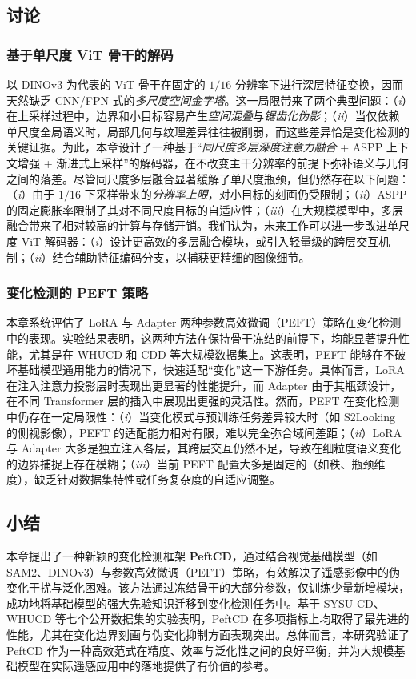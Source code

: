 \subsection{讨论}
\subsubsection{基于单尺度 ViT 骨干的解码}
以 DINOv3 为代表的 ViT 骨干在固定的 $1/16$ 分辨率下进行深层特征变换，因而天然缺乏 CNN/FPN 式的\emph{多尺度空间金字塔}。这一局限带来了两个典型问题：（\emph{i}）在上采样过程中，边界和小目标容易产生\emph{空间混叠}与\emph{锯齿化伪影}；（\emph{ii}）当仅依赖单尺度全局语义时，局部几何与纹理差异往往被削弱，而这些差异恰是变化检测的关键证据。为此，本章设计了一种基于“\emph{同尺度多层深度注意力融合} + ASPP 上下文增强 + 渐进式上采样”的解码器，在不改变主干分辨率的前提下弥补语义与几何之间的落差。尽管同尺度多层融合显著缓解了单尺度瓶颈，但仍然存在以下问题：（\emph{i}）由于 $1/16$ 下采样带来的\emph{分辨率上限}，对小目标的刻画仍受限制；（\emph{ii}）ASPP 的固定膨胀率限制了其对不同尺度目标的自适应性；（\emph{iii}）在大规模模型中，多层融合带来了相对较高的计算与存储开销。我们认为，未来工作可以进一步改进单尺度 ViT 解码器：（\emph{i}）设计更高效的多层融合模块，或引入轻量级的跨层交互机制；（\emph{ii}）结合辅助特征编码分支，以捕获更精细的图像细节。

\subsubsection{变化检测的 PEFT 策略}
本章系统评估了 LoRA 与 Adapter 两种参数高效微调（PEFT）策略在变化检测中的表现。实验结果表明，这两种方法在保持骨干冻结的前提下，均能显著提升性能，尤其是在 WHUCD 和 CDD 等大规模数据集上。这表明，PEFT 能够在不破坏基础模型通用能力的情况下，快速适配“变化”这一下游任务。具体而言，LoRA 在注入注意力投影层时表现出更显著的性能提升，而 Adapter 由于其瓶颈设计，在不同 Transformer 层的插入中展现出更强的灵活性。然而，PEFT 在变化检测中仍存在一定局限性：（\emph{i}）当变化模式与预训练任务差异较大时（如 S2Looking 的侧视影像），PEFT 的适配能力相对有限，难以完全弥合域间差距；（\emph{ii}）LoRA 与 Adapter 大多是独立注入各层，其跨层交互仍然不足，导致在细粒度语义变化的边界捕捉上存在模糊；（\emph{iii}）当前 PEFT 配置大多是固定的（如秩、瓶颈维度），缺乏针对数据集特性或任务复杂度的自适应调整。

\subsection{小结}
本章提出了一种新颖的变化检测框架 \textbf{PeftCD}，通过结合视觉基础模型（如 SAM2、DINOv3）与参数高效微调（PEFT）策略，有效解决了遥感影像中的伪变化干扰与泛化困难。该方法通过冻结骨干的大部分参数，仅训练少量新增模块，成功地将基础模型的强大先验知识迁移到变化检测任务中。基于 SYSU-CD、WHUCD 等七个公开数据集的实验表明，PeftCD 在多项指标上均取得了最先进的性能，尤其在变化边界刻画与伪变化抑制方面表现突出。总体而言，本研究验证了 PeftCD 作为一种高效范式在精度、效率与泛化性之间的良好平衡，并为大规模基础模型在实际遥感应用中的落地提供了有价值的参考。
